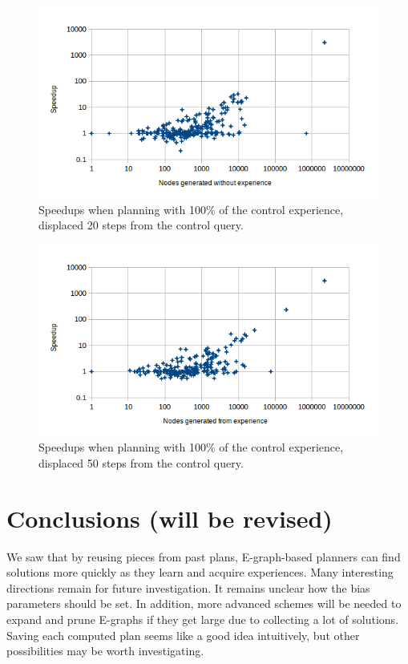 \documentclass[letterpaper]{article}
\begin{document}
\begin{figure}
	\centering
	\includegraphics[scale=0.5]{Speedup_100_20.png}
	\caption{Speedups when planning with 100\% of the control experience, displaced 20 steps from the control query.}
	 \label{fig:s_100_20}
\end{figure}

\begin{figure}
	\centering
	\includegraphics[scale=0.5]{Speedup_100_50.png}
	\caption{Speedups when planning with 100\% of the control experience, displaced 50 steps from the control query.}
	 \label{fig:s_100_50}
\end{figure}

\section{Conclusions (will be revised)}

We saw that by reusing pieces from past plans, E-graph-based planners can find solutions more quickly as they learn and acquire experiences. Many interesting directions remain for future investigation. It remains unclear how the bias parameters should be set. In addition, more advanced schemes will be needed to expand and prune E-graphs if they get large due to collecting a lot of solutions. Saving each computed plan seems like a good idea intuitively, but other possibilities may be worth investigating.
\end{document}
